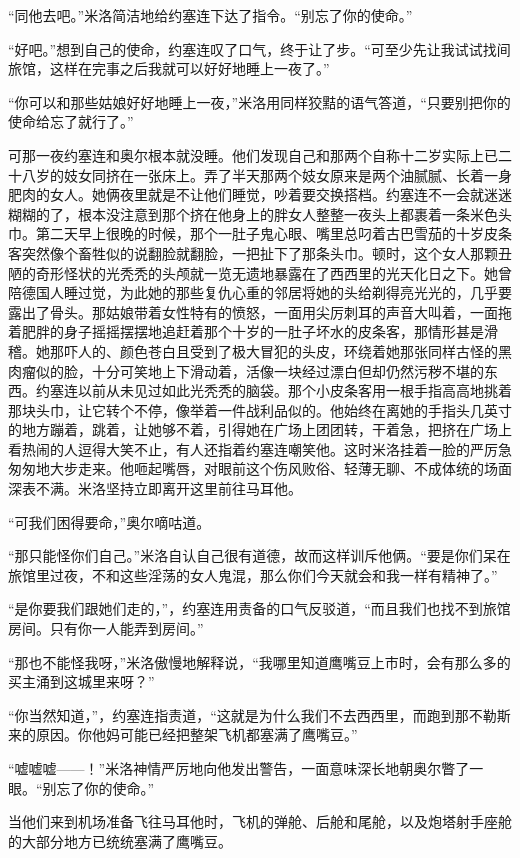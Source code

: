     “同他去吧。”米洛简洁地给约塞连下达了指令。“别忘了你的使命。”

    “好吧。”想到自己的使命，约塞连叹了口气，终于让了步。“可至少先让我试试找间旅馆，这样在完事之后我就可以好好地睡上一夜了。”

    “你可以和那些姑娘好好地睡上一夜，”米洛用同样狡黠的语气答道，“只要别把你的使命给忘了就行了。”

    可那一夜约塞连和奥尔根本就没睡。他们发现自己和那两个自称十二岁实际上已二十八岁的妓女同挤在一张床上。弄了半天那两个妓女原来是两个油腻腻、长着一身肥肉的女人。她俩夜里就是不让他们睡觉，吵着要交换搭档。约塞连不一会就迷迷糊糊的了，根本没注意到那个挤在他身上的胖女人整整一夜头上都裹着一条米色头巾。第二天早上很晚的时候，那个一肚子鬼心眼、嘴里总叼着古巴雪茄的十岁皮条客突然像个畜牲似的说翻脸就翻脸，一把扯下了那条头巾。顿时，这个女人那颗丑陋的奇形怪状的光秃秃的头颅就一览无遗地暴露在了西西里的光天化日之下。她曾陪德国人睡过觉，为此她的那些复仇心重的邻居将她的头给剃得亮光光的，几乎要露出了骨头。那姑娘带着女性特有的愤怒，一面用尖厉刺耳的声音大叫着，一面拖着肥胖的身子摇摇摆摆地追赶着那个十岁的一肚子坏水的皮条客，那情形甚是滑稽。她那吓人的、颜色苍白且受到了极大冒犯的头皮，环绕着她那张同样古怪的黑肉瘤似的脸，十分可笑地上下滑动着，活像一块经过漂白但却仍然污秽不堪的东西。约塞连以前从未见过如此光秃秃的脑袋。那个小皮条客用一根手指高高地挑着那块头巾，让它转个不停，像举着一件战利品似的。他始终在离她的手指头几英寸的地方蹦着，跳着，让她够不着，引得她在广场上团团转，干着急，把挤在广场上看热闹的人逗得大笑不止，有人还指着约塞连嘲笑他。这时米洛挂着一脸的严厉急匆匆地大步走来。他咂起嘴唇，对眼前这个伤风败俗、轻薄无聊、不成体统的场面深表不满。米洛坚持立即离开这里前往马耳他。

    “可我们困得要命，”奥尔嘀咕道。

    “那只能怪你们自己。”米洛自认自己很有道德，故而这样训斥他俩。“要是你们呆在旅馆里过夜，不和这些淫荡的女人鬼混，那么你们今天就会和我一样有精神了。”

    “是你要我们跟她们走的，”，约塞连用责备的口气反驳道，“而且我们也找不到旅馆房间。只有你一人能弄到房间。”

    “那也不能怪我呀，”米洛傲慢地解释说，“我哪里知道鹰嘴豆上市时，会有那么多的买主涌到这城里来呀？”

    “你当然知道，”，约塞连指责道，“这就是为什么我们不去西西里，而跑到那不勒斯来的原因。你他妈可能已经把整架飞机都塞满了鹰嘴豆。”

    “嘘嘘嘘——！”米洛神情严厉地向他发出警告，一面意味深长地朝奥尔瞥了一眼。“别忘了你的使命。”

    当他们来到机场准备飞往马耳他时，飞机的弹舱、后舱和尾舱，以及炮塔射手座舱的大部分地方已统统塞满了鹰嘴豆。


